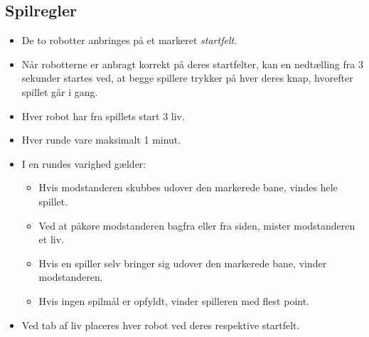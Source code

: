 \subsection{Spilregler}
\begin{itemize}
    \item De to robotter anbringes på et markeret \textit{startfelt}.
    \item Når robotterne er anbragt korrekt på deres startfelter, kan en nedtælling fra 3 sekunder startes ved, at begge spillere trykker på hver deres knap, hvorefter spillet går i gang.
    \item Hver robot har fra spillets start 3 liv.
    \item Hver runde vare maksimalt 1 minut.
    \item I en rundes varighed gælder:
    \begin{itemize}
        \item Hvis modstanderen skubbes udover den markerede bane, vindes hele spillet.
        \item Ved at påkøre modstanderen bagfra eller fra siden, mister modstanderen et liv.
        \item Hvis en spiller selv bringer sig udover den markerede bane, vinder modstanderen.
        \item Hvis ingen spilmål er opfyldt, vinder spilleren med flest point.
    \end{itemize}
    \item Ved tab af liv placeres hver robot ved deres respektive startfelt.
\end{itemize}